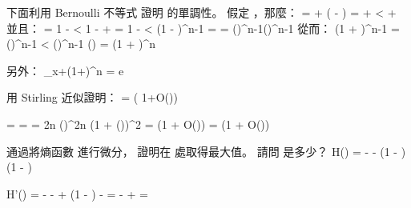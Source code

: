 下面利用 Bernoulli 不等式  證明  的單調性。
假定 ，那麼：
\startformula\startmathalignment
\NC {} \NC =  + \left( - \right) \NR
\NC \NC =  +  \NR
\NC \NC <  +  \NR
\stopmathalignment\stopformula
並且：
\startformula\startmathalignment
\NC {} \NC = 1 -  \NR
\NC \NC < 1 -  +  \NR
\NC \NC = 1 -  \NR
\NC \NC < \left(1 - \right)^{n-1} \qquad {} \NR
\NC \NC =  \NR
\NC \NC = \left(\right)^{n-1}\left(\right)^{n-1} \NR
\stopmathalignment\stopformula
從而：
\startformula\startmathalignment
\NC \left(1 + \right)^{n-1}
    \NC = \left(\right)^{n-1} \NR
\NC \NC < \left(\right)^{n-1} \left(\right) \NR
\NC \NC = \left(1 + \right)^n \NR
\stopmathalignment\stopformula

另外：
\startformula
\lim_{x\rightarrow +\infty}\left(1+\right)^n = e
\stopformula
\stopANSWER

\startEXERCISE[exercise:c_2n_n]\DIFFICULT
用 Stirling 近似證明：
\startformula
{} = 
               \left( 1+O\left(\right)\right) 
\stopformula
\stopEXERCISE

\startANSWER
\startformula\startmathalignment
\NC {} \NC =  =  \NR
\NC \NC = 
               {2\pi n \left(\right)^{2n}
                \left(1 + \Theta\left(\right)\right)^2} \NR
\NC \NC = 
          \left(1 + O\left(\right)\right) \NR
\NC \NC = 
	  \left(1 + O\left(\right)\right) \NR
\stopmathalignment\stopformula
\stopANSWER

\startEXERCISE\DIFFICULT
通過將熵函數  進行微分，
證明在  處取得最大值。
請問  是多少？
\startformula
H(\lambda) = -\lambda\lg{\lambda} - (1 - \lambda)\lg(1 - \lambda)
\stopformula
\stopEXERCISE

\startANSWER
\startformula\startmathalignment
\NC H'(\lambda) \NC= -\lg{\lambda} - 
                     + \lg(1 - \lambda)
                     -  \NR
\NC \NC = \lg{} -  +  \NR
\NC \NC = \lg{} \NR
\stopmathalignment\stopformula

